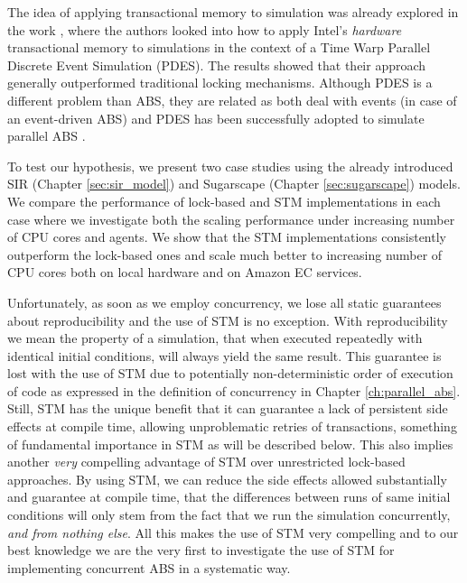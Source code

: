 The idea of applying transactional memory to simulation was already explored in the work \cite{hay_experiments_2015}, where the authors looked into how to apply Intel’s \textit{hardware} transactional memory to simulations in the context of a Time Warp Parallel Discrete Event Simulation (PDES). The results showed that their approach generally outperformed traditional locking mechanisms. Although PDES is a different problem than ABS, they are related as both deal with events (in case of an event-driven ABS) and PDES has been successfully adopted to simulate parallel ABS \cite{suryanarayanan_pdes-mas_2013}.

To test our hypothesis, we present two case studies using the already introduced SIR (Chapter \ref{sec:sir_model}) and Sugarscape (Chapter \ref{sec:sugarscape}) models. We compare the performance of lock-based and STM implementations in each case where we investigate both the scaling performance under increasing number of CPU cores and agents. We show that the STM implementations consistently outperform the lock-based ones and scale much better to increasing number of CPU cores both on local hardware and on Amazon EC services.

Unfortunately, as soon as we employ concurrency, we lose all static guarantees about reproducibility and the use of STM is no exception. With reproducibility we mean the property of a simulation, that when executed repeatedly with identical initial conditions, will always yield the same result. This guarantee is lost with the use of STM due to potentially non-deterministic order of execution of code as expressed in the definition of concurrency in Chapter \ref{ch:parallel_abs}. Still, STM has the unique benefit that it can guarantee a lack of persistent side effects at compile time, allowing unproblematic retries of transactions, something of fundamental importance in STM as will be described below. This also implies another \textit{very} compelling advantage of STM over unrestricted lock-based approaches. By using STM, we can reduce the side effects allowed substantially and guarantee at compile time, that the differences between runs of same initial conditions will only stem from the fact that we run the simulation concurrently, \textit{and from nothing else}. All this makes the use of STM very compelling and to our best knowledge we are the very first to investigate the use of STM for implementing concurrent ABS in a systematic way.









